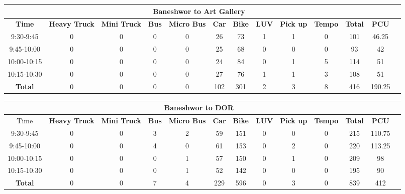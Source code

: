 \begin{landscape}
\centering
\begin{table}[h!]
\centering
\begin{tabular}{|c|c|c|c|c|c|c|c|c|c|c|c|c|}
    \hline
    \multicolumn{12}{|c|}{\textbf{Baneshwor to Art Gallery}} \\
    \hline
    \textbf{Time} & \textbf{Heavy Truck} & \textbf{Mini Truck} & \textbf{Bus} & \textbf{Micro Bus} & \textbf{Car} & \textbf{Bike} & \textbf{LUV} & \textbf{Pick up} & \textbf{Tempo} & \textbf{\textbf{Total}} & \textbf{PCU} \\
    \hline
9:30-9:45	&0	&0	&0	&0	&26	&73	&1	&1	&0	&101	&46.25 \\ \hline
9:45-10:00	&0	&0	&0	&0	&25	&68	&0	&0	&0	&93	&42 \\ \hline
10:00-10:15	&0	&0	&0	&0	&24	&84	&0	&1	&5	&114	&51 \\ \hline
10:15-10:30	&0	&0	&0	&0	&27	&76	&1	&1	&3	&108	&51 \\ \hline
\textbf{Total}	&0	&0	&0	&0	&102	&301	&2	&3	&8	&416	&190.25 \\ \hline

\end{tabular}

\vspace{0.5cm}

\begin{tabular}{|c|c|c|c|c|c|c|c|c|c|c|c|c|}
    \hline
    \multicolumn{12}{|c|}{\textbf{Baneshwor to DOR}} \\
    \hline
        Time & \textbf{Heavy Truck} & \textbf{Mini Truck} & \textbf{Bus} & \textbf{Micro Bus} & \textbf{Car} & \textbf{Bike} & \textbf{LUV} & \textbf{Pick up} & \textbf{Tempo} & \textbf{\textbf{Total}} & \textbf{PCU} \\
    \hline
9:30-9:45	&0	&0	&3	&2	&59	&151	&0	&0	&0	&215	&110.75 \\ \hline
9:45-10:00	&0	&0	&4	&0	&61	&153	&0	&2	&0	&220	&113.25 \\ \hline
10:00-10:15	&0	&0	&0	&1	&57	&150	&0	&1	&0	&209	&98 \\ \hline
10:15-10:30	&0	&0	&0	&1	&52	&142	&0	&0	&0	&195	&90 \\ \hline
\textbf{Total}	&0	&0	&7	&4	&229	&596	&0	&3	&0 &839 &412 \\ \hline

\end{tabular}

\vspace{0.5cm}


\end{table}
\end{landscape}
